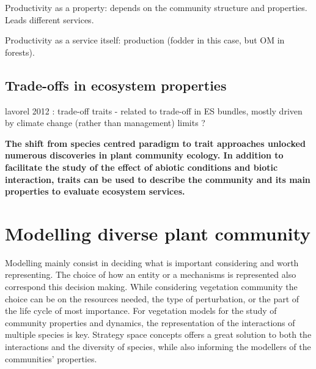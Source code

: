 Productivity as a property: depends on the community structure and properties. Leads different services.

Productivity as a service itself: production (fodder in this case, but OM in forests).

\textbf{}

\subsection{Trade-offs in ecosystem properties}

lavorel 2012 : trade-off  \parencite{lavorel_how_2012}
traits - related to trade-off in ES bundles, mostly driven by climate change (rather than management) \parencite{lamarque_plant_2014} limits ?


\textbf{The shift from species centred paradigm to trait approaches unlocked numerous discoveries in plant community ecology. In addition to facilitate the study of the effect of abiotic conditions and biotic interaction, traits can be used to describe the community and its main properties to evaluate ecosystem services.}




\section{Modelling diverse plant community}

Modelling mainly consist in deciding what is important considering and worth representing. The choice of how an entity or a mechanisms is represented also correspond this decision making. While considering vegetation community the choice can be on the resources needed, the type of perturbation, or the part of the life cycle of most importance. For vegetation models for the study of community properties and dynamics, the representation of the interactions of multiple species is key. Strategy space concepts offers a great solution to both the interactions and the diversity of species, while also informing the modellers of the communities' properties.

